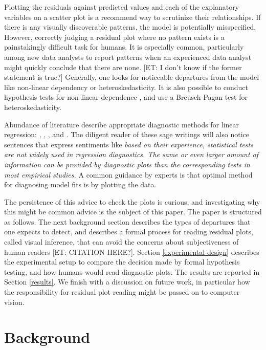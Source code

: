\documentclass[]{interact}
\theoremstyle{plain}%
\theoremstyle{definition}
\theoremstyle{remark}
\begin{document}
Plotting the residuals against predicted values and each of the
explanatory variables on a scatter plot is a recommend way to scrutinize
their relationships. If there is any visually discoverable patterns, the
model is potentially misspecified. However, correctly judging a residual
plot where no pattern exists is a painstakingly difficult task for
humans. It is especially common, particularly among new data analysts to
report patterns when an experienced data analyst might quickly conclude
that there are none. {[}ET: I don't know if the former statement is
true?{]} Generally, one looks for noticeable departures from the model
like non-linear dependency or heteroskedasticity. It is also possible to
conduct hypothesis tests for non-linear dependence
\citep{ramsey_tests_1969}, and use a Breusch-Pagan test
\citep{breusch_simple_1979} for heteroskedasticity.

Abundance of literature describe appropriate diagnostic methods for
linear regression: \citet{draper1998applied},
\citet{montgomery1982introduction}, \citet{belsley_regression_1980},
\citet{cook_applied_1999} and \citet{cook1982residuals}. The diligent
reader of these sage writings will also notice sentences that express
sentiments like \emph{based on their experience, statistical tests are
not widely used in regression diagnostics. The same or even larger
amount of information can be provided by diagnostic plots than the
corresponding tests in most empirical studies.} A common guidance by
experts is that optimal method for diagnosing model fits is by plotting
the data.

The persistence of this advice to check the plots is curious, and
investigating why this might be common advice is the subject of this
paper. The paper is structured as follows. The next background section
describes the types of departures that one expects to detect, and
describes a formal process for reading residual plots, called visual
inference, that can avoid the concerns about subjectiveness of human
readers {[}ET: CITATION HERE?{]}. Section \ref{experimental-design}
describes the experimental setup to compare the decision made by formal
hypothesis testing, and how humans would read diagnostic plots. The
results are reported in Section \ref{results}. We finish with a
discussion on future work, in particular how the responsibility for
residual plot reading might be passed on to computer vision.

\hypertarget{background}{%
\section{Background}\label{background}}
\end{document}
